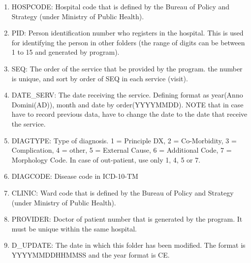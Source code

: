 \begin{enumerate}
  \item HOSPCODE: Hospital code that is defined by the Bureau of Policy and Strategy (under Ministry of Public Health). 
  \item PID: Person identification number who registers in the hospital. This is used for identifying the person in other folders (the range of digits can be between 1 to 15 and generated by program).
  \item SEQ: The order of the service that be provided by the program. the number is unique, and sort by order of SEQ in each service (visit).
  \item DATE\_SERV: The date receiving the service. Defining format as year(Anno Domini(AD)), month and date  by order(YYYYMMDD). NOTE that in case have to record previous data, have to change the date to the date that receive the service.
  \item DIAGTYPE: Type of diagnosis. 1 = Principle DX, 2 = Co-Morbidity, 3 = Complication, 4 = other, 5 = External Cause, 6 = Additional Code, 7 = Morphology Code. In case of out-patient, use only 1, 4, 5 or 7.
  \item DIAGCODE: Disease code in ICD-10-TM
  \item CLINIC: Ward code that is defined by the Bureau of Policy and Strategy (under Ministry of Public Health).
  \item PROVIDER: Doctor of patient number that is generated by the program. It must be unique within the same hospital.
  \item D\_UPDATE: The date in which this folder has been modified. The format is YYYYMMDDHHMMSS and the year format is CE.
\end{enumerate}